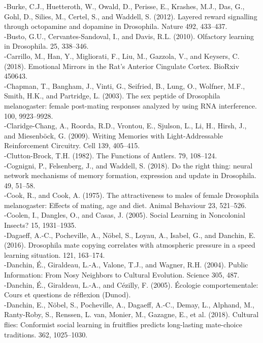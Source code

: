 \documentclass[a4paper, 12pt]{article}
\begin{document}
\begin{singlespace}
{-Burke, C.J., Huetteroth, W., Owald, D., Perisse, E., Krashes, M.J., Das, G., Gohl, D., Silies, M., Certel, S., and Waddell, S. (2012). Layered reward signalling through octopamine and dopamine in Drosophila. Nature 492, 433–437.\\
-Busto, G.U., Cervantes-Sandoval, I., and Davis, R.L. (2010). Olfactory learning in Drosophila. 25, 338–346.\\
-Carrillo, M., Han, Y., Migliorati, F., Liu, M., Gazzola, V., and Keysers, C. (2018). Emotional Mirrors in the Rat’s Anterior Cingulate Cortex. BioRxiv 450643.\\
-Chapman, T., Bangham, J., Vinti, G., Seifried, B., Lung, O., Wolfner, M.F., Smith, H.K., and Partridge, L. (2003). The sex peptide of Drosophila melanogaster: female post-mating responses analyzed by using RNA interference. 100, 9923–9928.\\
-Claridge-Chang, A., Roorda, R.D., Vrontou, E., Sjulson, L., Li, H., Hirsh, J., and Miesenböck, G. (2009). Writing Memories with Light-Addressable Reinforcement Circuitry. Cell 139, 405–415.\\
-Clutton-Brock, T.H. (1982). The Functions of Antlers. 79, 108–124.\\
-Cognigni, P., Felsenberg, J., and Waddell, S. (2018). Do the right thing: neural network mechanisms of memory formation, expression and update in Drosophila. 49, 51–58.\\
-Cook, R., and Cook, A. (1975). The attractiveness to males of female Drosophila melanogaster: Effects of mating, age and diet. Animal Behaviour 23, 521–526.\\
-Coolen, I., Dangles, O., and Casas, J. (2005). Social Learning in Noncolonial Insects? 15, 1931–1935.\\
-Dagaeff, A.-C., Pocheville, A., Nöbel, S., Loyau, A., Isabel, G., and Danchin, E. (2016). Drosophila mate copying correlates with atmospheric pressure in a speed learning situation. 121, 163–174.\\
-Danchin, É., Giraldeau, L.-A., Valone, T.J., and Wagner, R.H. (2004). Public Information: From Nosy Neighbors to Cultural Evolution. Science 305, 487.\\
-Danchin, É., Giraldeau, L.-A., and Cézilly, F. (2005). Écologie comportementale: Cours et questions de réflexion (Dunod).\\
-Danchin, E., Nöbel, S., Pocheville, A., Dagaeff, A.-C., Demay, L., Alphand, M., Ranty-Roby, S., Renssen, L. van, Monier, M., Gazagne, E., et al. (2018). Cultural flies: Conformist social learning in fruitflies predicts long-lasting mate-choice traditions. 362, 1025–1030.\\
}
\end{singlespace}
\end{document}
